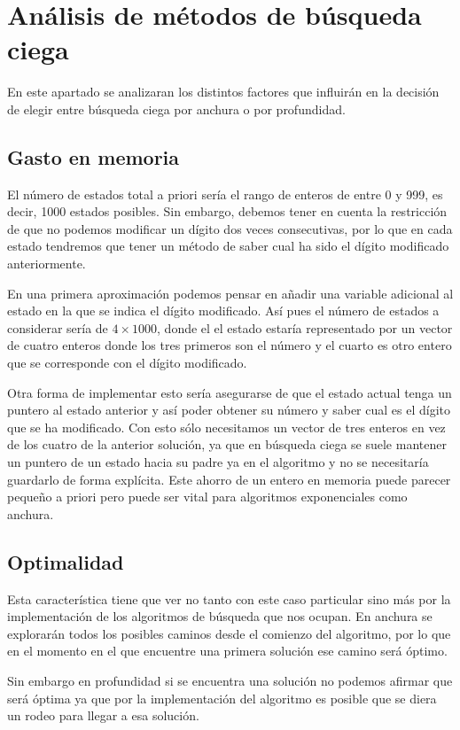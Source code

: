 \documentclass[12pt]{article}
\begin{document}
\section{Análisis de métodos de búsqueda ciega} 
En este apartado se analizaran los distintos factores que influirán en la decisión de elegir entre búsqueda ciega por anchura o por profundidad. 
\subsection{Gasto en memoria}
El número de estados total a priori sería el rango de enteros de entre 0 y 999, es decir, 1000 estados posibles. Sin embargo, debemos tener en cuenta la restricción de que no podemos modificar un dígito dos veces consecutivas, por lo que en cada estado tendremos que tener un método de saber cual ha sido el dígito modificado anteriormente. 

En una primera aproximación podemos pensar en añadir una variable adicional al estado en la que se indica el dígito modificado. Así pues el número de estados a considerar sería de $4 \times 1000$, donde el el estado estaría representado por un vector de cuatro enteros donde los tres primeros son el número y el cuarto es otro entero que se corresponde con el dígito modificado.

Otra forma de implementar esto sería asegurarse de que el estado actual tenga un puntero al estado anterior y así poder obtener su número y saber cual es el dígito que se ha modificado. Con esto sólo necesitamos un vector de tres enteros en vez de los cuatro de la anterior solución, ya que en búsqueda ciega se suele mantener un puntero de un estado hacia su padre ya en el algoritmo y no se necesitaría guardarlo de forma explícita. Este ahorro de un entero en memoria puede parecer pequeño a priori pero puede ser vital para algoritmos exponenciales como anchura.
\subsection{Optimalidad}
Esta característica tiene que ver no tanto con este caso particular sino más por la implementación de los algoritmos de búsqueda que nos ocupan. En anchura se explorarán todos los posibles caminos desde el comienzo del algoritmo, por lo que en el momento en el que encuentre una primera solución ese camino será óptimo. 

Sin embargo en profundidad si se encuentra una solución no podemos afirmar que será óptima ya que por la implementación del algoritmo es posible que se diera un rodeo para llegar a esa solución.
\end{document}
